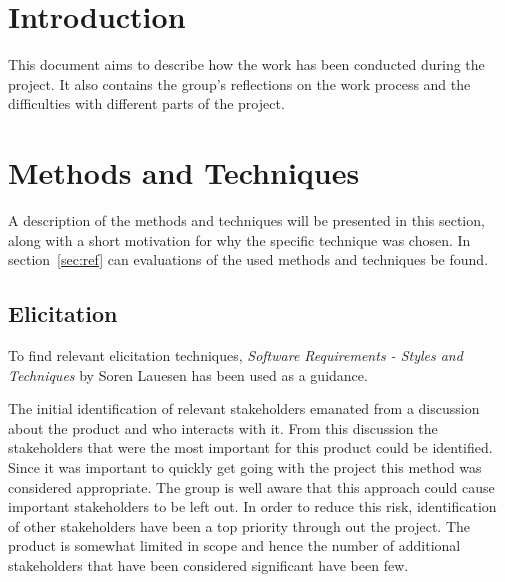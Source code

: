 \documentclass[10pt,a4paper]{article}
\begin{document}
\section{Introduction}
This document aims to describe how the work has been conducted during the project. It also contains the group's reflections on the work process and the difficulties with different parts of the project. 


\section{Methods and Techniques}
\label{sec:mat}
A description of the methods and techniques will be presented in this section, along with a short motivation for why the specific technique was chosen. In section~\ref{sec:ref} can evaluations of the used methods and techniques be found.

\subsection{Elicitation}
To find relevant elicitation techniques, \textit{Software Requirements - Styles and Techniques} by Soren Lauesen has been used as a guidance\cite{soren}.

The initial identification of relevant stakeholders emanated from a discussion about the product and who interacts with it. From this discussion the stakeholders that were the most important for this product could be identified. Since it was important to quickly get going with the project this method was considered appropriate. The group is well aware that this approach could cause important stakeholders to be left out. In order to reduce this risk, identification of other stakeholders have been a top priority through out the project. The product is somewhat limited in scope and hence the number of additional stakeholders that have been considered significant have been few. 
\end{document}
